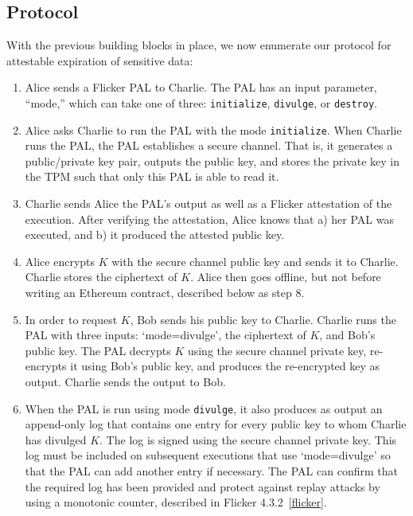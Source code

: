 \documentclass{article}
\begin{document}
\subsection{Protocol}

With the previous building blocks in place, we now enumerate our protocol for attestable expiration of sensitive data:

\begin{enumerate}

\item Alice sends a Flicker PAL to Charlie. The PAL has an input parameter, ``mode,'' which can take one of three: \texttt{initialize}, \texttt{divulge}, or \texttt{destroy}.

\item Alice asks Charlie to run the PAL with the mode \texttt{initialize}. When Charlie runs the PAL, the PAL establishes a secure channel. That is, it generates a public/private key pair, outputs the public key, and stores the private key in the TPM such that only this PAL is able to read it.

\item Charlie sends Alice the PAL's output as well as a Flicker attestation of the execution. After verifying the attestation, Alice knows that a) her PAL was executed, and b) it produced the attested public key.

\item Alice encrypts $K$ with the secure channel public key and sends it to Charlie. Charlie stores the ciphertext of $K$. Alice then goes offline, but not before writing an Ethereum contract, described below as step 8.

\item In order to request $K$, Bob sends his public key to Charlie. Charlie runs the PAL with three inputs: `mode=divulge', the ciphertext of $K$, and Bob's public key. The PAL decrypts $K$ using the secure channel private key, re-encrypts it using Bob's public key, and produces the re-encrypted key as output. Charlie sends the output to Bob.

\item When the PAL is run using mode \texttt{divulge}, it also produces as output an append-only log that contains one entry for every public key to whom Charlie has divulged $K$. The log is signed using the secure channel private key. This log must be included on subsequent executions that use `mode=divulge' so that the PAL can add another entry if necessary. The PAL can confirm that the required log has been provided and protect against replay attacks by using a monotonic counter, described in Flicker 4.3.2~\ref{flicker}.


\end{enumerate}
\end{document}
